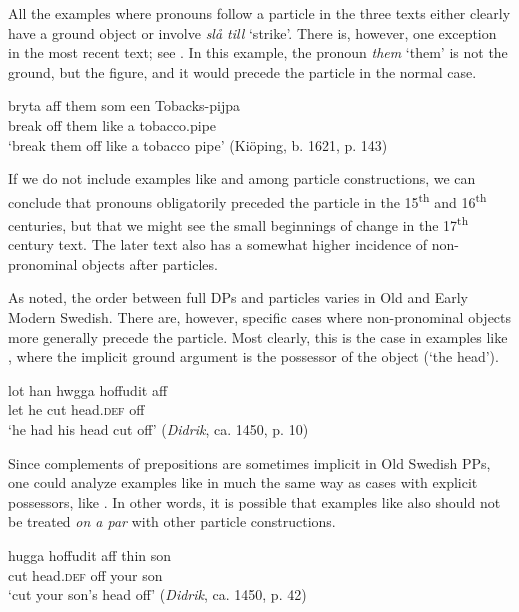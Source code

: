 \documentclass[output=paper]{langscibook}
\begin{document}
All the examples where pronouns follow a particle in the three texts either clearly have a ground object or involve \textit{slå till} ‘strike’. There is, however, one exception in the most recent text; see . In this example, the pronoun \textit{them} ‘them’ is not the ground, but the figure, and it would precede the particle in the normal case.


\ea\label{ex:lalu:29}
\gll  bryta     aff   them   som   een     Tobacks-pijpa\\
break   off   them   like     a     tobacco.pipe\\
\glt `break them off like a tobacco pipe’ (Kiöping, b. 1621, p. 143)\\
\z


If we do not include examples like  and  among particle constructions, we can conclude that pronouns obligatorily preceded the particle in the 15\textsuperscript{th} and 16\textsuperscript{th} centuries, but that we might see the small beginnings of change in the 17\textsuperscript{th} century text. The later text also has a somewhat higher incidence of non-pronominal objects after particles.



As noted, the order between full DPs and particles varies in Old and Early Modern Swedish. There are, however, specific cases where non-pronominal objects more generally precede the particle. Most clearly, this is the case in examples like , where the implicit ground argument is the possessor of the object (‘the head’).


\ea\label{ex:lalu:30}
\gll  lot    han   hwgga   hoffudit aff\\
let    he   cut     head.\textsc{def}   off \\
\glt `he had his head cut off’ (\textit{Didrik}, ca. 1450, p. 10)\\
\z


Since complements of prepositions are sometimes implicit in Old Swedish PPs, one could analyze examples like  in much the same way as cases with explicit possessors, like . In other words, it is possible that examples like  also should not be treated \textit{on a par} with other particle constructions.


\ea\label{ex:lalu:31}
\gll  hugga   hoffudit       aff     thin     son\\
cut         head.\textsc{def}   off   your   son\\
\glt `cut your son’s head off’ (\textit{Didrik}, ca. 1450, p. 42)\\
\z
\end{document}
